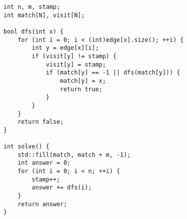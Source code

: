 \begin{lstlisting}
int n, m, stamp;
int match[N], visit[N];

bool dfs(int x) {
    for (int i = 0; i < (int)edge[x].size(); ++i) {
        int y = edge[x][i];
        if (visit[y] != stamp) {
            visit[y] = stamp;
            if (match[y] == -1 || dfs(match[y])) {
                match[y] = x;
                return true;
            }
        }
    }
    return false;
}

int solve() {
    std::fill(match, match + m, -1);
    int answer = 0;
    for (int i = 0; i < n; ++i) {
        stamp++;
        answer += dfs(i);
    }
    return answer;
}
\end{lstlisting}
